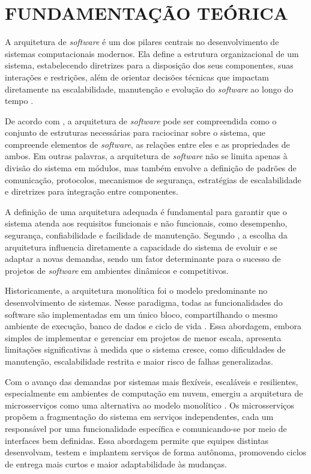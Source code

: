 \chapter{FUNDAMENTAÇÃO TEÓRICA} \label{cap:Fundamentacao}
A arquitetura de \textit{software} é um dos pilares centrais no desenvolvimento de sistemas computacionais modernos. Ela define a estrutura organizacional de um sistema, estabelecendo diretrizes para a disposição dos seus componentes, suas interações e restrições, além de orientar decisões técnicas que impactam diretamente na escalabilidade, manutenção e evolução do \textit{software} ao longo do tempo \cite{jamshidi2016systematic}.

De acordo com \cite{jamshidi2016systematic}, a arquitetura de \textit{software} pode ser compreendida como o conjunto de estruturas necessárias para raciocinar sobre o sistema, que compreende elementos de \textit{software}, as relações entre eles e as propriedades de ambos. Em outras palavras, a arquitetura de \textit{software} não se limita apenas à divisão do sistema em módulos, mas também envolve a definição de padrões de comunicação, protocolos, mecanismos de segurança, estratégias de escalabilidade e diretrizes para integração entre componentes.

A definição de uma arquitetura adequada é fundamental para garantir que o sistema atenda aos requisitos funcionais e não funcionais, como desempenho, segurança, confiabilidade e facilidade de manutenção. Segundo \cite{nizami2020comparison}, a escolha da arquitetura influencia diretamente a capacidade do sistema de evoluir e se adaptar a novas demandas, sendo um fator determinante para o sucesso de projetos de \textit{software} em ambientes dinâmicos e competitivos.

Historicamente, a arquitetura monolítica foi o modelo predominante no desenvolvimento de sistemas. Nesse paradigma, todas as funcionalidades do software são implementadas em um único bloco, compartilhando o mesmo ambiente de execução, banco de dados e ciclo de vida \cite{nizami2020comparison}. Essa abordagem, embora simples de implementar e gerenciar em projetos de menor escala, apresenta limitações significativas à medida que o sistema cresce, como dificuldades de manutenção, escalabilidade restrita e maior risco de falhas generalizadas. 

Com o avanço das demandas por sistemas mais flexíveis, escaláveis e resilientes, especialmente em ambientes de computação em nuvem, emergiu a arquitetura de microsserviços como uma alternativa ao modelo monolítico \cite{jamshidi2016systematic, shekhar2023microservices}. Os microsserviços propõem a fragmentação do sistema em serviços independentes, cada um responsável por uma funcionalidade específica e comunicando-se por meio de interfaces bem definidas. Essa abordagem permite que equipes distintas desenvolvam, testem e implantem serviços de forma autônoma, promovendo ciclos de entrega mais curtos e maior adaptabilidade às mudanças. 

